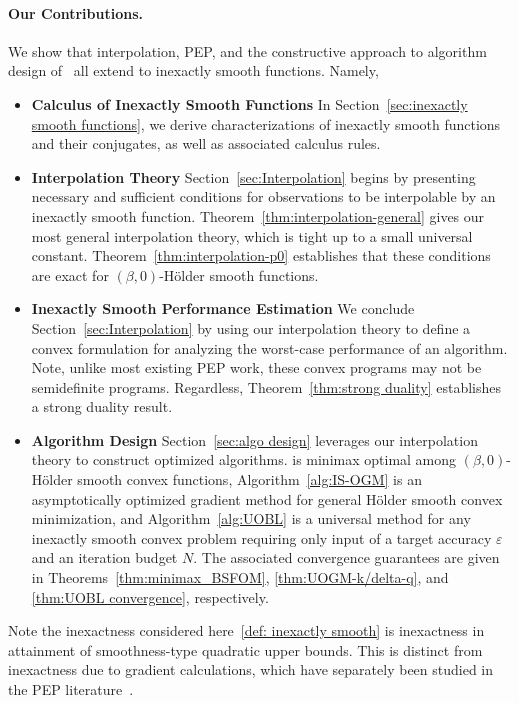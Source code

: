 \documentclass[11pt, hidelinks]{article}
\numberwithin{equation}{section}
\theoremstyle{thmstyletwo}%
\numberwithin{equation}{section}
\newcommand{\eps}{\varepsilon}
\newcommand{\Holder}{H\"older }
\begin{document}
\paragraph{Our Contributions.}
We show that interpolation, PEP, and the constructive approach to algorithm design of~\cite{constructive_approach} all extend to inexactly smooth functions. Namely,
\begin{itemize}
    \item \textbf{Calculus of Inexactly Smooth Functions} In Section~\ref{sec:inexactly smooth functions}, we derive characterizations of inexactly smooth functions and their conjugates, as well as associated calculus rules.
    \item  \textbf{Interpolation Theory} Section~\ref{sec:Interpolation} begins by presenting necessary and sufficient conditions for observations to be interpolable by an inexactly smooth function. Theorem~\ref{thm:interpolation-general} gives our most general interpolation theory, which is tight up to a small universal constant.  Theorem~\ref{thm:interpolation-p0} establishes that these conditions are exact for $(\beta,0)$-\Holder smooth functions. 
    \item  \textbf{Inexactly Smooth Performance Estimation} We conclude Section~\ref{sec:Interpolation} by using our interpolation theory to define a convex formulation for analyzing the worst-case performance of an algorithm. Note, unlike most existing PEP work, these convex programs may not be semidefinite programs. Regardless, Theorem~\ref{thm:strong duality} establishes a strong duality result.
   \item \textbf{Algorithm Design} Section~\ref{sec:algo design} leverages our interpolation theory to construct optimized algorithms.  is minimax optimal among $(\beta, 0)$-\Holder smooth convex functions, Algorithm~\ref{alg:IS-OGM} is an asymptotically optimized gradient method for general \Holder smooth convex minimization, and Algorithm~\ref{alg:UOBL} is a universal method for any inexactly smooth convex problem requiring only input of a target accuracy $\eps$ and an iteration budget $N$. The associated convergence guarantees are given in Theorems~\ref{thm:minimax_BSFOM}, \ref{thm:UOGM-k/delta-q}, and \ref{thm:UOBL convergence}, respectively. 
\end{itemize}
\noindent Note the inexactness considered here~\eqref{def: inexactly smooth} is inexactness in attainment of smoothness-type quadratic upper bounds. This is distinct from inexactness due to gradient calculations, which have separately been studied in the PEP literature~\cite{liu2025nonasymptoticanalysisacceleratedmethods, deklerk2017exactlinesearch, deklerk2020inexact, gannot2022frequency}. 
\end{document}
